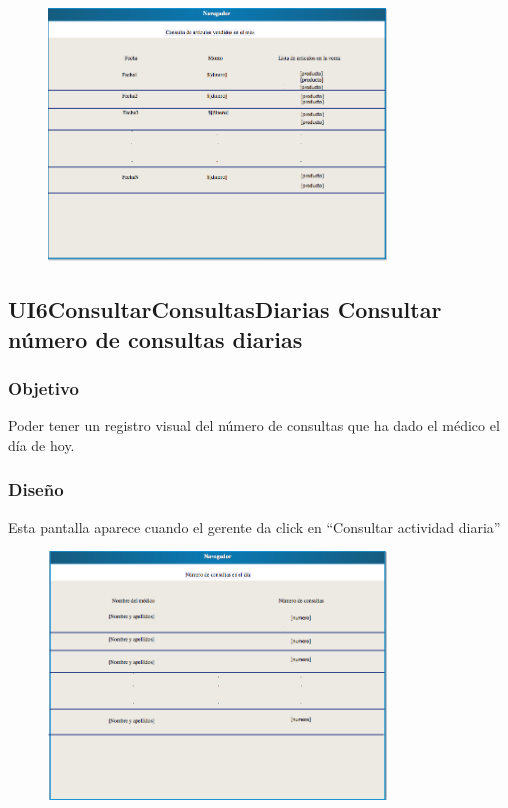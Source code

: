 \begin{figure}[htbp!]
        \centering
            \includegraphics[width=0.8\textwidth]{images/consultaVentasMes}
            
            
    \end{figure}
    

\subsection{UI6ConsultarConsultasDiarias Consultar número de consultas diarias}
\subsubsection{Objetivo}
Poder tener un registro visual del número de consultas que ha dado el médico el día de hoy.
\subsubsection{Diseño}
   Esta pantalla aparece cuando el gerente da click en ``Consultar actividad diaria'' 


\begin{figure}[htbp!]
        \centering
            \includegraphics[width=0.8\textwidth]{images/consultaCitasDia}
            
            
    \end{figure}
 
